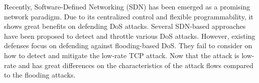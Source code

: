 

Recently, Software-Defined Networking (SDN) has been emerged as a promising network paradigm. Due to its centralized control and flexible programmability, it shows great benefits on defending DoS attacks. Several SDN-based approaches~\cite{b9, b16, b11, b23, b24} have been proposed to detect and throttle various DoS attacks. However, existing defenses focus on defending against flooding-based DoS. They fail to consider on how to detect and mitigate the low-rate TCP attack. Now that the attack is low-rate and has great differences on the characteristics of the attack flows compared to the flooding attacks.


